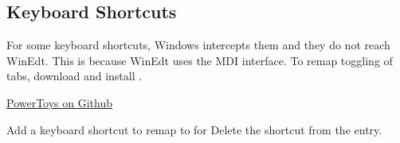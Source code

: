 \documentclass{lebook}
\begin{document}
	\subsection{Keyboard Shortcuts}
For some keyboard shortcuts, Windows intercepts them and they do not reach WinEdt.  This is because WinEdt uses the MDI interface.  To remap toggling of tabs, download and install .
	\begin{plainlist}
		\item \href{https://github.com/microsoft/PowerToys}{PowerToys on Github}
	\end{plainlist}

Add a keyboard shortcut to remap  to  for 
Delete the  shortcut from the  entry.

	
\end{document}
